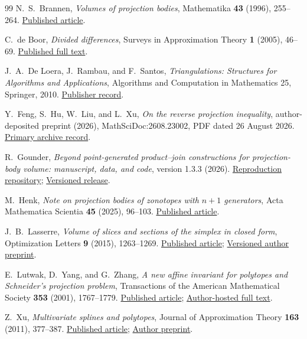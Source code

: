 \documentclass[11pt]{article}
\begin{document}
\begingroup
\small
\begin{thebibliography}{99}
N.~S.~Brannen, \emph{Volumes of projection bodies}, Mathematika
\textbf{43} (1996), 255--264.
\href{https://doi.org/10.1112/S002557930001175X}{Published article}.

C.~de Boor, \emph{Divided differences}, Surveys in Approximation Theory
\textbf{1} (2005), 46--69.
\href{https://surveys-in-approximation-theory.com/papers/2/2.pdf}{Published full text}.

J.~A.~De Loera, J.~Rambau, and F.~Santos, \emph{Triangulations: Structures
for Algorithms and Applications}, Algorithms and Computation in
Mathematics 25, Springer, 2010.
\href{https://doi.org/10.1007/978-3-642-12971-1}{Publisher record}.

Y.~Feng, S.~Hu, W.~Liu, and L.~Xu, \emph{On the reverse projection
inequality}, author-deposited preprint (2026), MathSciDoc:2608.23002,
PDF dated 26 August 2026.
\href{https://archive.ymsc.tsinghua.edu.cn/pacm_paperurl/20260821091122099811781}{Primary archive record}.

R.~Gounder, \emph{Beyond point-generated product--join constructions for
projection-body volume: manuscript, data, and code}, version 1.3.3 (2026).
\href{https://github.com/Kohze/projection-body-separation}{Reproduction repository};
\href{https://github.com/Kohze/projection-body-separation/releases/tag/v1.3.3}{Versioned release}.

M.~Henk, \emph{Note on projection bodies of zonotopes with $n+1$ generators},
Acta Mathematica Scientia \textbf{45} (2025), 96--103.
\href{https://doi.org/10.1007/s10473-025-0107-9}{Published article}.

J.~B.~Lasserre, \emph{Volume of slices and sections of the simplex in
closed form}, Optimization Letters \textbf{9} (2015), 1263--1269.
\href{https://doi.org/10.1007/s11590-015-0898-z}{Published article};
\href{https://arxiv.org/abs/1412.4617v1}{Versioned author preprint}.

E.~Lutwak, D.~Yang, and G.~Zhang, \emph{A new affine invariant for
polytopes and Schneider's projection problem}, Transactions of the
American Mathematical Society \textbf{353} (2001), 1767--1779.
\href{https://doi.org/10.1090/S0002-9947-01-02726-X}{Published article};
\href{https://cims.nyu.edu/~yangd/papers/trans.pdf}{Author-hosted full text}.

Z.~Xu, \emph{Multivariate splines and polytopes}, Journal of Approximation
Theory \textbf{163} (2011), 377--387.
\href{https://doi.org/10.1016/j.jat.2010.10.005}{Published article};
\href{https://arxiv.org/abs/0806.1127v4}{Author preprint}.


\end{thebibliography}
\end{document}

